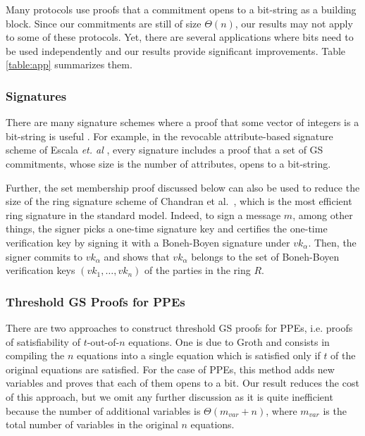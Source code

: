 Many protocols use proofs that a commitment opens to a bit-string as a 
  building block. 
Since our commitments are still of size $\Theta(n)$,
  our results may not apply to some of these protocols. 
Yet, there are several applications where 
  bits need to be used independently and our results provide 
  significant improvements.
Table \ref{table:app} summarizes them.
 
\subsubsection{Signatures} There are many signature schemes where a proof that some vector of integers is a bit-string is useful \cite{PKC:BFPV11,SCN:BlaPoiVer12,RSA:Camacho13,AFRICACRYPT:EscHerMor11}. For example, in the revocable attribute-based signature scheme of Escala \textit{et. al} \cite{AFRICACRYPT:EscHerMor11}, every signature includes a proof that a set of GS commitments, whose size is the number of attributes, opens to a bit-string. 

Further, the set membership proof discussed below can also be used to reduce the size of the ring signature scheme of Chandran et al.~\cite{ICALP:ChaGroSah07}, which is the most efficient ring signature in the standard model. Indeed, to sign a message $m$, among other things, the signer picks a one-time signature key and certifies the one-time verification key by signing it with a Boneh-Boyen signature under $vk_\alpha$. Then, the signer commits to $vk_\alpha$ and shows that $vk_\alpha$ belongs to the set of Boneh-Boyen verification keys $(vk_1,\ldots,vk_n)$ of the parties in the ring $R$. 



\subsubsection{Threshold GS Proofs for PPEs} There are two approaches to construct threshold GS proofs for PPEs, i.e. proofs of satisfiability of $t$-out-of-$n$ equations. One is due to Groth \cite{AC:Groth06} and consists in compiling the $n$ equations into a single equation which is satisfied only if $t$ of the original equations are satisfied. For the case of PPEs, this method adds new variables and proves that each of them opens to a bit.  Our result reduces the cost of this approach, but we omit any further discussion as it is quite inefficient because the number of additional variables is $\Theta(m_{var}+n)$, where $m_{var}$ is the total number of variables in the original $n$ equations.

